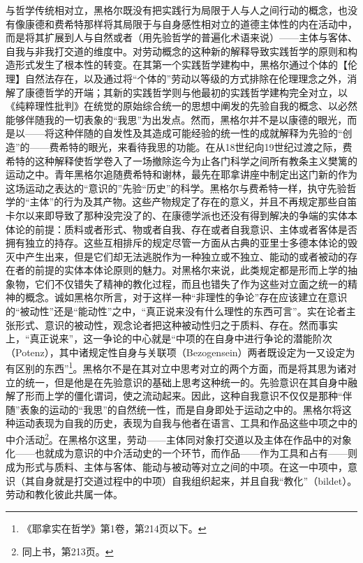 与哲学传统相对立，黑格尔既没有把实践行为局限于人与人之间行动的概念，也没有像康德和费希特那样将其局限于与自身感性相对立的道德主体性的内在活动中，而是将其扩展到人与自然或者（用先验哲学的普遍化术语来说）——主体与客体、自我与非我打交道的维度中。对劳动概念的这种新的解释导致实践哲学的原则和构造形式发生了根本性的转变。在其第一个实践哲学建构中，黑格尔通过个体的【伦理】自然法存在，以及通过将“个体的”劳动以等级的方式排除在伦理理念之外，消解了康德哲学的开端；其新的实践哲学则与他最初的实践哲学建构完全对立，以《纯粹理性批判》在统觉的原始综合统一的思想中阐发的先验自我的概念、以必然能够伴随我的一切表象的“我思”为出发点。然而，黑格尔并不是以康德的眼光，而是以——将这种伴随的自发性及其造成可能经验的统一性的成就解释为先验的“创造”的——费希特的眼光，来看待我思的功能。在从18世纪向19世纪过渡之际，费希特的这种解释使哲学卷入了一场撤除迄今为止各门科学之间所有教条主义樊篱的运动之中。青年黑格尔追随费希特和谢林，最先在耶拿讲座中制定出这门新的作为这场运动之表达的“意识的”先验“历史”的科学。黑格尔与费希特一样，执守先验哲学的“主体”的行为及其产物。这些产物规定了存在的意义，并且不再规定那些自笛卡尔以来即导致了那种没完没了的、在康德学派也还没有得到解决的争端的实体本体论的前提：质料或者形式、物或者自我、存在或者自我意识、主体或者客体是否拥有独立的持存。这些互相排斥的规定尽管一方面从古典的亚里士多德本体论的毁灭中产生出来，但是它们却无法逃脱作为一种独立或不独立、能动的或者被动的存在者的前提的实体本体论原则的魅力。对黑格尔来说，此类规定都是形而上学的抽象物，它们不仅错失了精神的教化过程，而且也错失了作为这些对立面之统一的精神的概念。诚如黑格尔所言，对于这样一种“非理性的争论”存在应该建立在意识的“被动性”还是“能动性”之中，“真正说来没有什么理性的东西可言”。实在论者主张形式、意识的被动性，观念论者把这种被动性归之于质料、存在。然而事实上，“真正说来”，这一争论的中心就是“中项的在自身中进行争论的潜能阶次（Potenz），其中诸规定性自身与关联项（Bezogensein）两者既设定为一又设定为有区别的东西”\footnote{《耶拿实在哲学》第1卷，第214页以下。}。黑格尔不是在其对立中思考对立的两个方面，而是将其思为诸对立的统一，但是他是在先验意识的基础上思考这种统一的。先验意识在其自身中融解了形而上学的僵化谓词，使之流动起来。因此，这种自我意识不仅仅是那种“伴随”表象的运动的“我思”的自然统一性，而是自身即处于运动之中的。黑格尔将这种运动表现为自我的历史，表现为自我与他者在语言、工具和作品这些中项之中的中介活动\footnote{同上书，第213页。}。在黑格尔这里，劳动——主体同对象打交道以及主体在作品中的对象化——也就成为意识的中介活动史的一个环节，而作品——作为工具和占有——则成为形式与质料、主体与客体、能动与被动等对立之间的中项。在这一中项中，意识（其自身就是打交道过程中的中项）自我组织起来，并且自我“教化”（bildet）。劳动和教化彼此共属一体。

